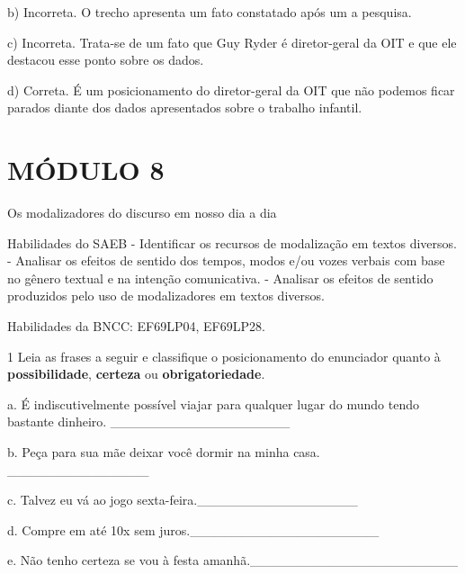 b) Incorreta. O trecho apresenta um fato constatado após um a pesquisa.

c) Incorreta. Trata-se de um fato que Guy Ryder é diretor-geral da OIT e
que ele destacou esse ponto sobre os dados.

d) Correta. É um posicionamento do diretor-geral da OIT que não podemos
ficar parados diante dos dados apresentados sobre o trabalho infantil.

\hypertarget{muxf3dulo-8}{%
\section{MÓDULO 8}\label{muxf3dulo-8}}

Os modalizadores do discurso em nosso dia a dia

Habilidades do SAEB - Identificar os recursos de modalização em textos
diversos. - Analisar os efeitos de sentido dos tempos, modos e/ou vozes
verbais com base no gênero textual e na intenção comunicativa. -
Analisar os efeitos de sentido produzidos pelo uso de modalizadores em
textos diversos.

Habilidades da BNCC: EF69LP04, EF69LP28.


\num{1} Leia as frases a seguir e classifique o posicionamento do
enunciador quanto à \textbf{possibilidade}, \textbf{certeza} ou
\textbf{obrigatoriedade}.

a. É indiscutivelmente possível viajar para qualquer lugar do mundo
tendo bastante dinheiro. \_\_\_\_\_\_\_\_\_\_\_\_\_\_\_\_\_\_\_

b. Peça para sua mãe deixar você dormir na minha casa.
\_\_\_\_\_\_\_\_\_\_\_\_\_\_\_

c. Talvez eu vá ao jogo sexta-feira.\_\_\_\_\_\_\_\_\_\_\_\_\_\_\_\_\_

d. Compre em até 10x sem juros.\_\_\_\_\_\_\_\_\_\_\_\_\_\_\_\_\_\_\_\_

e. Não tenho certeza se vou à festa
amanhã.\_\_\_\_\_\_\_\_\_\_\_\_\_\_\_\_\_\_\_\_\_\_

